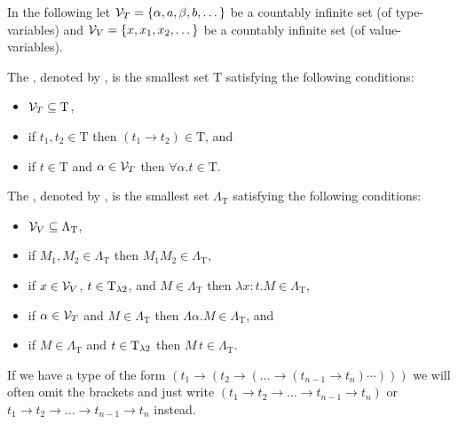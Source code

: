 In the following let $\mathcal{V}_T=\{\alpha,a,\beta,b,\dots\}$ be a countably infinite set (of type-variables) and $\mathcal{V}_V=\{x,x_1,x_2,\dots\}$ be a countably infinite set (of value-variables).
\begin{definition}\label{def.2.1}
	The , denoted by \lambdaTypes{}, is the smallest set T satisfying the following conditions: %
	\begin{itemize}
		\item $\mathcal{V}_T\subseteq\text{T}$,
		\item if $t_1,t_2\in\text{T}$ then $(t_1\to t_2)\in\text{T}$, and
		\item if $t\in\text{T}$ and $\alpha\in\mathcal{V}_T$ then $\forall\alpha.t\in\text{T}$.
	\end{itemize}
	
	The , denoted by \lambdaTerms{}, is the smallest set $\Lambda_\text{T}$ satisfying the following conditions: %
	\begin{itemize}
		\item $\mathcal{V}_V\subseteq\Lambda_\text{T}$,
		\item if $M_1,M_2\in\Lambda_\text{T}$ then $M_1M_2\in\Lambda_\text{T}$,
		\item if $x\in\mathcal{V}_V$, $t\in\text{T}_{\lambda2}$, and $M\in\Lambda_\text{T}$ then $\lambda x:t.M\in\Lambda_\text{T}$,
		\item if $\alpha\in\mathcal{V}_T$ and $M\in\Lambda_\text{T}$ then $\Lambda \alpha.M\in\Lambda_\text{T}$, and
		\item if $M\in\Lambda_\text{T}$ and $t\in\text{T}_{\lambda2}$ then $M\,t\in\Lambda_\text{T}$.
	\end{itemize}
\end{definition}
If we have a type of the form $(t_1\to(t_2\to(\dots \to(t_{n-1}\to t_n)\cdots)))$ we will often omit the brackets and just write $(t_1\to t_2\to\dots\to t_{n-1}\to t_n)$ or $t_1\to t_2\to\dots \to t_{n-1}\to t_n$ instead. %
